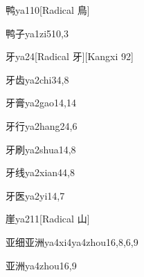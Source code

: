 \begin{verbete}{鸭}{ya1}{10}[Radical 鳥]
\end{verbete}

\begin{verbete}{鸭子}{ya1zi5}{10,3}
\end{verbete}

\begin{verbete}{牙}{ya2}{4}[Radical 牙][Kangxi 92]
\end{verbete}

\begin{verbete}{牙齿}{ya2chi3}{4,8}
\end{verbete}

\begin{verbete}{牙膏}{ya2gao1}{4,14}
\end{verbete}

\begin{verbete}{牙行}{ya2hang2}{4,6}
\end{verbete}

\begin{verbete}{牙刷}{ya2shua1}{4,8}
\end{verbete}

\begin{verbete}{牙线}{ya2xian4}{4,8}
\end{verbete}

\begin{verbete}{牙医}{ya2yi1}{4,7}
\end{verbete}

\begin{verbete}{崖}{ya2}{11}[Radical 山]
\end{verbete}

\begin{verbete}{亚细亚洲}{ya4xi4ya4zhou1}{6,8,6,9}
\end{verbete}

\begin{verbete}{亚洲}{ya4zhou1}{6,9}
\end{verbete}

